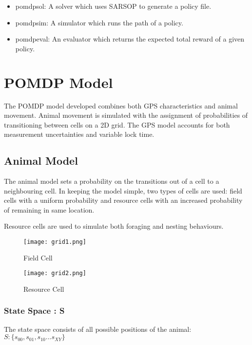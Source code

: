 \documentclass[12pt,openany,a4paper]{book}
\begin{document}
\begin{itemize}
\item {pomdpsol: A solver which uses SARSOP to generate a policy file.}
\item {pomdpsim: A simulator which runs the path of a policy.}
\item {pomdpeval: An evaluator which returns the expected total reward of a given policy.}
\end{itemize}

\chapter{POMDP Model }
The POMDP model developed combines both GPS characteristics and animal movement.
Animal movement is simulated with the assignment of probabilities of transitioning between cells on a 2D grid. The GPS model accounts for both measurement uncertainties and variable lock time.

\section{Animal Model}
The animal model sets a probability on the transitions out of a cell to a neighbouring cell. In keeping the model simple, two types of cells are used: field cells with a uniform probability and resource cells with an increased probability of remaining in same location.

Resource cells are used to simulate both foraging and nesting behaviours.

\begin{figure} [htbp]
\begin{center}
\caption{Field Cell}
\texttt{[image: grid1.png]}
\end{center}
\end{figure}

\begin{figure} [htbp]
\begin{center}
\caption{Resource Cell}
\texttt{[image: grid2.png]}
\end{center}
\end{figure}
\subsection*{State Space : S}
The state space consists of all possible positions of the animal: \\
\ensuremath{ S :\{s_{00}, s_{01}, s_{10} ... s_{XY}\} }
\end{document}
